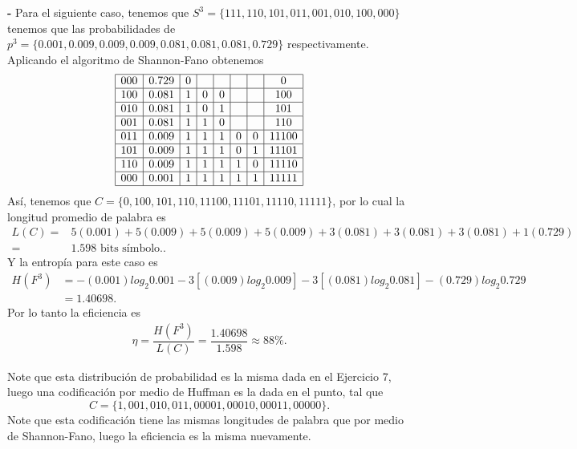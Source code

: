 \begin{sol}
\textbf{-} Para el siguiente caso, tenemos que $S^{3} =\{111 ,110 ,101,011, 001, 010, 100 ,000\}$ tenemos que las probabilidades de $p^{3}=\{0\text{.}001 , 0\text{.}009 , 0\text{.}009 , 0\text{.}009, 0\text{.}081 , 0\text{.}081, 0\text{.}081,  0\text{.}729\}$ respectivamente. Aplicando el algoritmo de Shannon-Fano obtenemos  
\[
\begin{array}{|c|c|c|c|c|c|c|c|}
\hline
000 & 0\text{.}729 & 0 & & & & &0\\
\hline
100 & 0\text{.}081 & 1 &0 &0 & & &100\\
\hline
010 & 0\text{.}081 & 1 &0 &1 & & &101\\
\hline
001 & 0\text{.}081 & 1 &1 &0 & & &110\\
\hline
011 & 0\text{.}009 & 1 &1 &1 &0 &0 &11100\\
\hline
101 & 0\text{.}009 & 1 &1 &1 &0 &1 &11101\\
\hline
110 & 0\text{.}009 & 1 &1 &1 &1 &0 &11110\\
\hline
000 & 0\text{.}001 & 1 &1 &1 &1 &1 &11111\\
\hline
\end{array}
\]
Así, tenemos que $C=\{0, 100, 101, 110, 11100, 11101, 11110, 11111\}$, por lo cual la longitud promedio de palabra es 
\begin{align*}
L(C)=&  5(0.001) + 5(0.009) +5(0.009) +5(0.009) + 3(0.081)+3(0.081)+3(0.081) + 1(0.729) \\
=& 1.598 \text{ bits símbolo.}
.\end{align*}
Y la entropía para este caso es
\begin{align*}
    H(F^{3})&=-(0.001)log_2 0.001-3[(0.009)log_2 0.009]-3[(0.081)log_2 0.081 ]-(0.729)log_2 0.729\\
    &= 1.40698
.\end{align*}
Por lo tanto la eficiencia es 
\begin{align*}
    \eta= \dfrac{H(F^{3})}{L(C)}=\dfrac{1.40698}{1.598}\approx 88\%
.\end{align*}

Note que esta distribución de probabilidad es la misma dada en el Ejercicio 7, luego una codificación por medio de Huffman es la dada en el punto, tal que
$$C=\{1,001,010,011,00001,00010,00011,00000\}.$$
Note que esta codificación tiene las mismas longitudes de palabra que por medio de Shannon-Fano, luego la eficiencia es la misma nuevamente.
















\end{sol}
